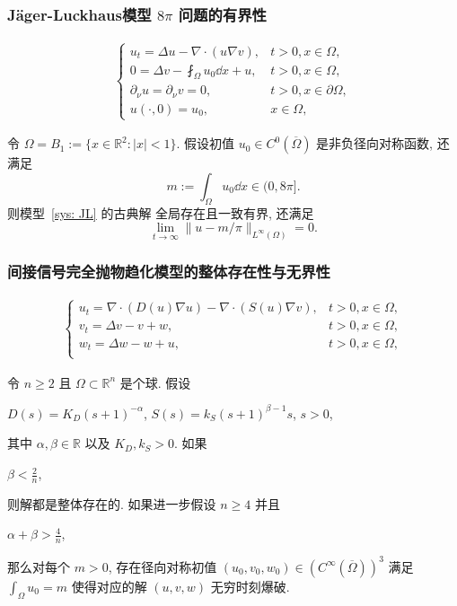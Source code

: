 \begin{frame}
  \frametitle{J\"ager-Luckhaus模型 \texorpdfstring{$8\pi$}{8pi} 问题的有界性}
  \begin{align}
    \begin{cases}
      \label{sys: JL}
      u_t = \Delta u - \nabla \cdot(u\nabla v), & t>0, x\in\Omega,          \\
      0 =  \Delta v - \fint_\Omega u_0\dd{x} + u,                  & t>0, x\in\Omega,          \\
      \partial_\nu u = \partial_\nu v = 0 ,     & t >0, x\in\partial\Omega, \\
      u(\cdot, 0) = u_0,                        & x\in\Omega,
    \end{cases}
  \end{align}

  \begin{theorem}[M-Li-arXiv-2024]
    \label{thm: global wellposedness}
    令 \(\Omega=B_1 :=\{x\in\mathbb R^2: |x|<1\}\).
    假设初值 \(u_0\in C^0(\overline{\Omega})\) 是非负径向对称函数, 还满足
    \[
      m := \int_\Omega u_0\dd x \in(0, 8\pi].
    \]
    则模型~\eqref{sys: JL}
    的古典解 全局存在且一致有界, 还满足
    \[
      \lim_{t\to\infty}\|u-m/\pi\|_{L^\infty(\Omega)} = 0.
    \]
  \end{theorem} 
\end{frame}

\begin{frame}
  \frametitle{间接信号完全抛物趋化模型的整体存在性与无界性}
  \begin{align}
    \begin{cases}
      \label{sys: ks isp ppp}
        u_t = \nabla\cdot (D(u) \nabla u) - \nabla \cdot(S(u)\nabla v),&  t>0, x\in\Omega,\\
        v_t =  \Delta v - v + w,&  t>0, x\in\Omega,	\\
        w_t  = \Delta w - w + u, &  t > 0, x\in\Omega, \\
    \end{cases}
    \end{align}

    \begin{corollary}[M-Li-arXiv-2024]
      \label{coro: infinite-time blowup}
      令 $n\geq2$ 且 $\Omega\subset\mathbb R^n$ 是个球.
      假设 
      \centerline{$D(s) = K_D(s+1)^{-\alpha}$, $S(s) = k_S(s+1)^{\beta-1}s$, $s>0$,}
      其中 $\alpha,\beta\in\mathbb R$ 以及 $K_D,k_S > 0$.
      如果 
      \centerline{$\beta < \frac2n$,}
      则解都是整体存在的.
      如果进一步假设 $n\geq4$ 并且
      \centerline{  $\alpha + \beta > \frac{4}{n}$,}
      那么对每个 $m>0$, 存在径向对称初值 $(u_0, v_0, w_0)\in (C^\infty(\overline{\Omega}))^3$ 
    满足 $\int_\Omega u_0 = m$ 使得对应的解 $(u,v,w)$ %
      无穷时刻爆破.
    \end{corollary}
\end{frame}

